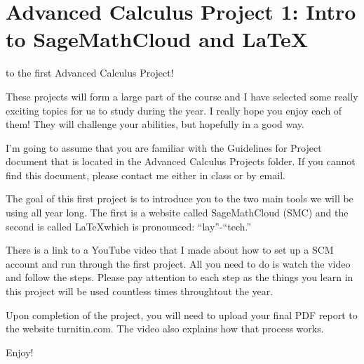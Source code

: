 \documentclass
[justified,nohyper]
{tufte-handout}
\begin{document}
\begin{center}
\end{center}
\section{Advanced Calculus Project 1: Intro to SageMathCloud and \LaTeX}
 to the first Advanced Calculus Project!

These projects will form a large part of the course and I have selected some really exciting topics for us to study during the year. I really hope you enjoy each of them! They will challenge your abilities, but hopefully in a good way.

I'm going to assume that you are familiar with the Guidelines for Project document that is located in the Advanced Calculus Projects folder. If you cannot find this document, please contact me either in class or by email.

The goal of this first project is to introduce you to the two main tools we will be using all year long. The first is a website called SageMathCloud (SMC) and the second is called \LaTeX which is pronounced: ``lay''-``tech.''

There is a link to a YouTube video that I made about how to set up a SCM account and run through the first project. All you need to do is watch the video and follow the steps. Please pay attention to each step as the things you learn in this project will be used countless times throughtout the year.

Upon completion of the project, you will need to upload your final PDF report to the website turnitin.com. The video also explains how that process works.

Enjoy! 
\end{document}
